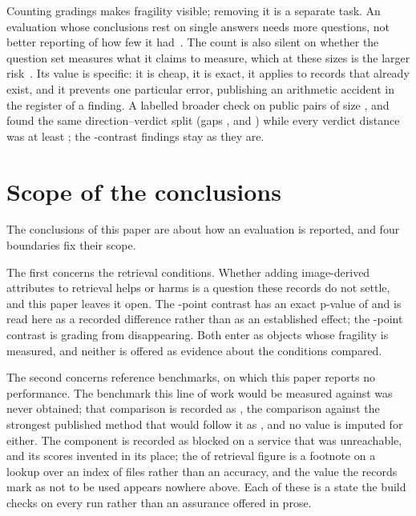 Counting gradings makes fragility visible; removing it is a separate task. An
evaluation whose conclusions rest on single answers needs more questions, not
better reporting of how few it had~\cite{card2020little,bowman2021will}. The
count is also silent on whether the question set measures what it claims to
measure, which at these sizes is the larger risk~\cite{raji2021everything}. Its
value is specific: it is cheap, it is exact, it applies to records that already
exist, and it prevents one particular error, publishing an arithmetic accident
in the register of a finding. A labelled broader check on \SecondEvalN{} public pairs
of size \SecondEvalNArc{}, \SecondEvalNGsm{} and \SecondEvalNWino{} found
the same direction--verdict split (gaps \SecondEvalGapArc{},
\SecondEvalGapGsm{} and \SecondEvalGapWino{}) while every verdict
distance was at least \SecondEvalKappaVerMin{}; the
\Contrasts{}-contrast findings stay as they are.

\section{Scope of the conclusions}

The conclusions of this paper are about how an evaluation is reported, and
four boundaries fix their scope.

The first concerns the retrieval conditions. Whether adding image-derived
attributes to retrieval helps or harms is a question these records do not
settle, and this paper leaves it open. The \HelpDiff{}-point contrast has an
exact p-value of \HelpP{} and is read here as a recorded difference rather than
as an established effect; the \HarmDiff{}-point contrast is \HarmK{} grading
from disappearing. Both enter as objects whose fragility is measured, and
neither is offered as evidence about the conditions compared.

The second concerns reference benchmarks, on which this paper reports no
performance. The benchmark this line of work would be measured against was
never obtained; that comparison is recorded as \PrimaryTier{}, the comparison
against the strongest published method that would follow it as \SotaTier{}, and
no value is imputed for either. The \BlockedComponent{} component is recorded
as blocked on a service that was unreachable, and its scores \ForgedState{}
invented in its place; the \RetrievalCorrect{} of \RetrievalN{} retrieval figure
is a footnote on a lookup over an index of \IndexFiles{} files rather than an
accuracy, and the value the records mark as not to be used appears nowhere
above. Each of these is a state the build checks on every run rather than an
assurance offered in prose.

